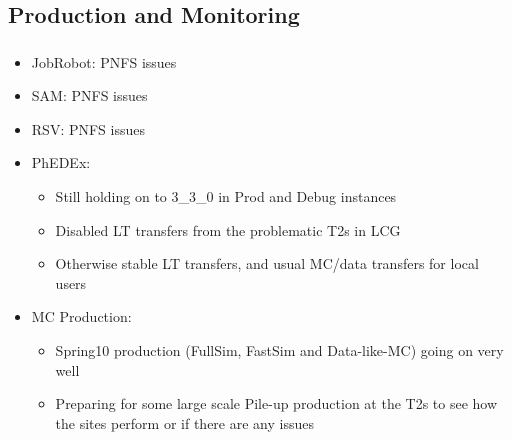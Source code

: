 \documentclass{beamer}
\begin{document}
\subsection{Production and Monitoring}
\begin{frame}
\frametitle{}

\begin{itemize}
	\item JobRobot: PNFS issues
	\item SAM: PNFS issues
	\item RSV: PNFS issues
	\item PhEDEx:
	\begin{itemize}
		\item Still holding on to 3\_3\_0 in Prod and Debug instances
		\item Disabled LT transfers from the problematic T2s in LCG
		\item Otherwise stable LT transfers, and usual MC/data transfers for local users
	\end{itemize}
	\item MC Production:
	\begin{itemize}
		\item Spring10 production (FullSim, FastSim and Data-like-MC) going on very well
		\item Preparing for some large scale Pile-up production at the T2s to see how the sites perform or if there are any issues
	\end{itemize}
\end{itemize}
\end{frame}
\end{document}
